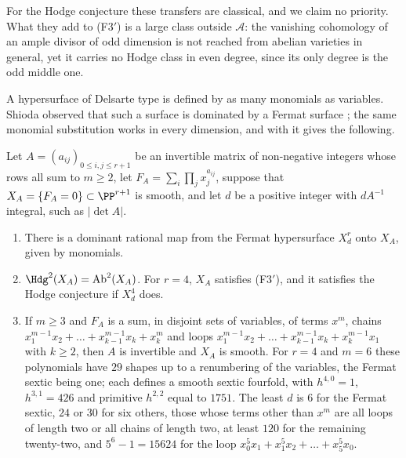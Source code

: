 For the Hodge conjecture these transfers are classical, and we claim no
priority. What they add to \textup{(F3$'$)} is a large class outside
$\mathcal{A}$: the vanishing cohomology of an ample divisor of odd dimension
is not reached from abelian varieties in general, yet it carries no Hodge
class in even degree, since its only degree is the odd middle one.

A hypersurface of Delsarte type is defined by as many monomials as
variables. Shioda observed that such a surface is dominated by a Fermat
surface \cite{Shi86}; the same monomial substitution works in every
dimension, and with  it gives the following.

\begin{proposition}\label{prop:delsarte}
Let $A=(a_{ij})_{0\le i,j\le r+1}$ be an invertible matrix of non-negative
integers whose rows all sum to $m\ge2$, let $F_{A}=\sum_{i}\prod_{j}
x_{j}^{a_{ij}}$, suppose that $X_{A}=\{F_{A}=0\}\subset\PP^{r+1}$ is smooth,
and let $d$ be a positive integer with $dA^{-1}$ integral, such as
$|\det A|$.
\begin{enumerate}[label=\textup{(\roman*)},leftmargin=2.6em,itemsep=2pt]
\item There is a dominant rational map from the Fermat hypersurface
  $X^{r}_{d}$ onto $X_{A}$, given by monomials.
\item $\Hdg^{2}(X_{A})=\mathrm{Ab}^{2}(X_{A})$. For $r=4$, $X_{A}$
  satisfies \textup{(F3$'$)}, and it satisfies the Hodge conjecture if
  $X^{4}_{d}$ does.
\item If $m\ge3$ and $F_{A}$ is a sum, in disjoint sets of variables, of
  terms $x^{m}$, chains $x_{1}^{m-1}x_{2}+\dots+x_{k-1}^{m-1}x_{k}+x_{k}^{m}$
  and loops $x_{1}^{m-1}x_{2}+\dots+x_{k-1}^{m-1}x_{k}+x_{k}^{m-1}x_{1}$
  with $k\ge2$, then $A$ is invertible and $X_{A}$ is smooth. For $r=4$ and
  $m=6$ these polynomials have $29$ shapes up to a renumbering of the
  variables, the Fermat sextic being one; each defines a smooth sextic
  fourfold, with $h^{4,0}=1$, $h^{3,1}=426$ and primitive $h^{2,2}$ equal
  to $1751$. The least $d$ is $6$ for the Fermat sextic, $24$ or $30$ for
  six others, those whose terms other than $x^{m}$ are all loops of length
  two or all chains of length two, at least $120$ for the remaining
  twenty-two, and $5^{6}-1=15624$ for the loop
  $x_{0}^{5}x_{1}+x_{1}^{5}x_{2}+\dots+x_{5}^{5}x_{0}$.
\end{enumerate}
\end{proposition}

